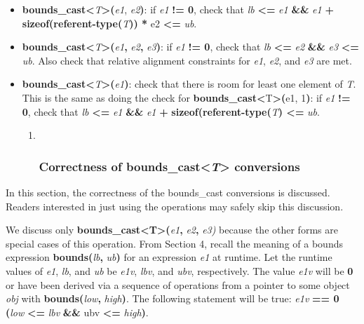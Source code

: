 \begin{itemize}
\item
  \textbf{bounds\_cast\textless{}}\emph{T}\textbf{\textgreater{}(}\emph{e1},
  \emph{e2}\textbf{)}: if \emph{e1} \textbf{!= 0}, check that \emph{lb}
  \textbf{\textless{}=} \emph{e1} \textbf{\&\&} \emph{e1} \textbf{+
  sizeof(referent-type(}\emph{T}\textbf{)) *} e2 \textbf{\textless{}=}
  \emph{ub}.
\item
  \textbf{bounds\_cast\textless{}}\emph{T}\textbf{\textgreater{}(}\emph{e1}\textbf{,}
  \emph{e2}\textbf{,} \emph{e3}\textbf{)}: if \emph{e1} \textbf{!= 0},
  check that \emph{lb} \textbf{\textless{}=} \emph{e2} \textbf{\&\&}
  \emph{e3} \textbf{\textless{}=} \emph{ub}. Also check that relative
  alignment constraints for \emph{e1}, \emph{e2}, and \emph{e3} are met.
\item
  \textbf{bounds\_cast\textless{}}\emph{T}\textbf{\textgreater{}(}\emph{e1}\textbf{)}:
  check that there is room for least one element of \emph{T}. This is
  the same as doing the check for
  \textbf{bounds\_cast\textless{}}T\textbf{\textgreater{}(}e1,
  1\textbf{)}: if \emph{e1} \textbf{!=} \textbf{0}, check that \emph{lb}
  \textbf{\textless{}=} \emph{e1} \textbf{\&\&} \emph{e1} \textbf{+}
  \textbf{sizeof(referent-type(}\emph{T}\textbf{) \textless{}=}
  \emph{ub}.

  \begin{enumerate}
  \def\labelenumi{\arabic{enumi}.}
  \item ~
    \subsubsection{\texorpdfstring{\protect\hypertarget{ux5fToc437460798}{}{\protect\hypertarget{ux5fToc440445479}{}{\protect\hypertarget{ux5fToc440449261}{}{\protect\hypertarget{ux5fToc440551911}{}{}}}}Correctness
    of bounds\_cast\textless{}\emph{T}\textgreater{}
    conversions}{Correctness of bounds\_cast\textless{}T\textgreater{} conversions}}\label{correctness-of-boundsux5fcastt-conversions}
  \end{enumerate}
\end{itemize}

In this section, the correctness of the bounds\_cast conversions is
discussed. Readers interested in just using the operations may safely
skip this discussion.

We discuss only
\textbf{bounds\_cast\textless{}T\textgreater{}(}\emph{e1}\textbf{,}
\emph{e2}\textbf{,} \emph{e3)} because the other forms are special cases
of this operation. From Section 4, recall the meaning of a bounds
expression \textbf{bounds(}\emph{lb}\textbf{,} \emph{ub}\textbf{)} for
an expression \emph{e1} at runtime. Let the runtime values of \emph{e1},
\emph{lb}, and \emph{ub} be \emph{e1v}, \emph{lbv}, and \emph{ubv},
respectively. The value \emph{e1v} will be \textbf{0} or have been
derived via a sequence of operations from a pointer to some object
\emph{obj} with \textbf{bounds(}\emph{low}\textbf{,}
\emph{high}\textbf{)}. The following statement will be true: \emph{e1v}
\textbf{== 0 \textbar{}\textbar{} (}\emph{low} \textbf{\textless{}=}
\emph{lbv} \textbf{\&\&} ubv \textbf{\textless{}=}
\emph{high}\textbf{)}.

